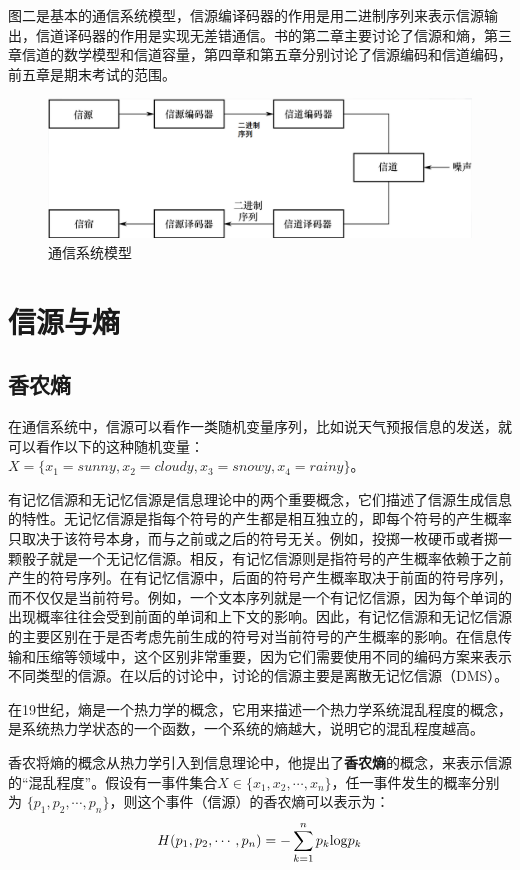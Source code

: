 \documentclass[UTF8,a4paper,11pt]{article}
\begin{document}
图二是基本的通信系统模型，信源编译码器的作用是用二进制序列来表示信源输出，信道译码器的作用是实现无差错通信。书的第二章主要讨论了信源和熵，第三章信道的数学模型和信道容量，第四章和第五章分别讨论了信源编码和信道编码，前五章是期末考试的范围。
\begin{figure}[htbp]
\centering
\includegraphics[scale=0.45]{p2.png}
\caption{通信系统模型}
\end{figure}

\section{信源与熵}
\subsection{香农熵}
在通信系统中，信源可以看作一类随机变量序列，比如说天气预报信息的发送，就可以看作以下的这种随机变量：$X=\{x_1=sunny,x_2=cloudy,x_3=snowy,x_4=rainy\}$。

有记忆信源和无记忆信源是信息理论中的两个重要概念，它们描述了信源生成信息的特性。无记忆信源是指每个符号的产生都是相互独立的，即每个符号的产生概率只取决于该符号本身，而与之前或之后的符号无关。例如，投掷一枚硬币或者掷一颗骰子就是一个无记忆信源。相反，有记忆信源则是指符号的产生概率依赖于之前产生的符号序列。在有记忆信源中，后面的符号产生概率取决于前面的符号序列，而不仅仅是当前符号。例如，一个文本序列就是一个有记忆信源，因为每个单词的出现概率往往会受到前面的单词和上下文的影响。因此，有记忆信源和无记忆信源的主要区别在于是否考虑先前生成的符号对当前符号的产生概率的影响。在信息传输和压缩等领域中，这个区别非常重要，因为它们需要使用不同的编码方案来表示不同类型的信源。在以后的讨论中，讨论的信源主要是离散无记忆信源（DMS）。

在19世纪，熵是一个热力学的概念，它用来描述一个热力学系统混乱程度的概念，是系统热力学状态的一个函数，一个系统的熵越大，说明它的混乱程度越高。

香农将熵的概念从热力学引入到信息理论中，他提出了\textbf{香农熵}的概念，来表示信源的“混乱程度”。假设有一事件集合$X\in \{x_1,x_2,\cdots,x_n\}$，任一事件发生的概率分别为 $\{p_1,p_2,\cdots,p_n\}$，则这个事件（信源）的香农熵可以表示为：
\begin{equation}
H(p_1,p_2,\cdots,p_n)=-\sum_{k=1}^n p_k{\rm log}p_k
\end{equation}
\end{document}
